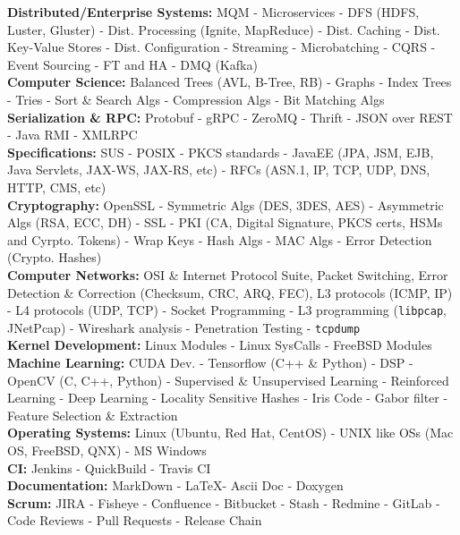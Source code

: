 \documentclass[10pt,a4paper]{article}
\begin{document}
\textbullet \hspace{0.1cm}\textbf{Distributed/Enterprise Systems:} MQM - Microservices - DFS (HDFS, Luster, Gluster) - Dist. Processing (Ignite, MapReduce) - Dist. Caching - Dist. Key-Value Stores - Dist. Configuration - Streaming - Microbatching - CQRS - Event Sourcing - FT and HA - DMQ (Kafka)  \\
\textbullet \hspace{0.1cm}\textbf{Computer Science:} Balanced Trees (AVL, B-Tree, RB) - Graphs - Index Trees - Tries - Sort \& Search Algs - Compression Algs - Bit Matching Algs  \\
\textbullet \hspace{0.1cm}\textbf{Serialization \& RPC:} Protobuf - gRPC - ZeroMQ - Thrift - JSON over REST - Java RMI - XMLRPC \\
\textbullet \hspace{0.1cm}\textbf{Specifications:} SUS - POSIX - PKCS standards - JavaEE (JPA, JSM, EJB, Java Servlets, JAX-WS, JAX-RS, etc) - RFCs (ASN.1, IP, TCP, UDP, DNS, HTTP, CMS, etc) \\
\textbullet \hspace{0.1cm}\textbf{Cryptography:} OpenSSL - Symmetric Algs (DES, 3DES, AES) - Asymmetric Algs (RSA, ECC, DH) - SSL - PKI (CA, Digital Signature, PKCS certs, HSMs and Cyrpto. Tokens) - Wrap Keys - Hash Algs - MAC Algs - Error Detection (Crypto. Hashes)  \\ 
\textbullet \hspace{0.1cm}\textbf{Computer Networks:} OSI \& Internet Protocol Suite, Packet Switching, Error Detection \& Correction (Checksum, CRC, ARQ, FEC), L3 protocols (ICMP, IP) - L4 protocols (UDP, TCP) - Socket Programming - L3 programming (\texttt{libpcap}, JNetPcap) - Wireshark analysis - Penetration Testing - \texttt{tcpdump} \\
\textbullet \hspace{0.1cm}\textbf{Kernel Development:} Linux Modules - Linux SysCalls - FreeBSD Modules \\
\textbullet \hspace{0.1cm}\textbf{Machine Learning:} CUDA Dev. - Tensorflow (C++ \& Python) - DSP - OpenCV (C, C++, Python) - Supervised \& Unsupervised Learning - Reinforced Learning - Deep Learning - Locality Sensitive Hashes - Iris Code - Gabor filter - Feature Selection \& Extraction \\
\textbullet \hspace{0.1cm}\textbf{Operating Systems:} Linux (Ubuntu, Red Hat, CentOS) - UNIX like OSs (Mac OS, FreeBSD, QNX) - MS Windows \\
\textbullet \hspace{0.1cm}\textbf{CI:} Jenkins - QuickBuild - Travis CI \\
\textbullet \hspace{0.1cm}\textbf{Documentation:} MarkDown - \LaTeX - Ascii Doc - Doxygen \\
\textbullet \hspace{0.1cm}\textbf{Scrum:} JIRA - Fisheye - Confluence - Bitbucket - Stash - Redmine - GitLab -Code Reviews - Pull Requests - Release Chain
\end{document}

